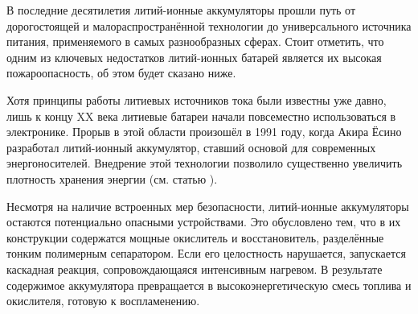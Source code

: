 

















В последние десятилетия литий-ионные аккумуляторы прошли путь от дорогостоящей и малораспространённой технологии 
до универсального источника питания, применяемого в самых разнообразных сферах. 
Стоит отметить, что одним из ключевых недостатков литий-ионных батарей является их высокая пожароопасность, 
об этом будет сказано ниже.

Хотя принципы работы литиевых источников тока были известны уже давно, 
лишь к концу XX века литиевые батареи начали повсеместно использоваться в электронике. 
Прорыв в этой области произошёл в 1991 году, когда Акира Ёсино разработал литий-ионный аккумулятор, 
ставший основой для современных энергоносителей. 
Внедрение этой технологии позволило существенно увеличить плотность хранения энергии (см. статью \cite{admt_201700376}).

Несмотря на наличие встроенных мер безопасности, литий-ионные аккумуляторы остаются потенциально опасными устройствами. 
Это обусловлено тем, что в их конструкции содержатся мощные окислитель и восстановитель, разделённые тонким полимерным сепаратором. 
Если его целостность нарушается, запускается каскадная реакция, сопровождающаяся интенсивным нагревом. 
В результате содержимое аккумулятора превращается в высокоэнергетическую смесь топлива и окислителя, готовую к воспламенению.

